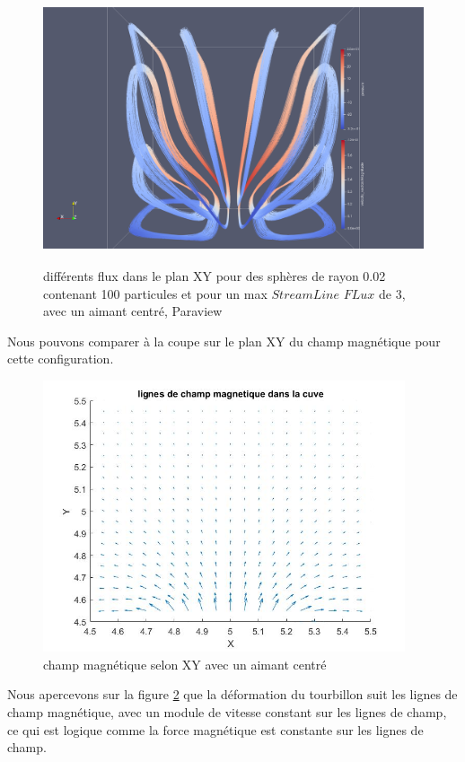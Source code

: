 \documentclass[a4paper,12pt,titlepage]{report}
\begin{document}
\begin{onehalfspace}
\begin{figure}[!h]
\begin{center}
\includegraphics[height = 8cm, keepaspectratio]{graphes/Paraview/differents_flux_centre_100pt_lenght4_rad05.png} 
\caption{\label{figure 33}différents flux dans le plan XY pour des sphères de rayon 0.02 contenant 100 particules et pour un max $StreamLine$ $FLux$ de 3, avec un aimant centré, Paraview}
\end{center}
\end{figure}

Nous pouvons comparer à la coupe sur le plan XY du champ magnétique pour cette configuration.

\begin{figure}[!h]
\begin{center} 
\includegraphics[height = 8cm, keepaspectratio]{graphes/coupe_2D_champ_centre.jpg} 
\caption{\label{figure 34} champ magnétique selon XY avec un aimant centré}
\end{center}
\end{figure}
Nous apercevons sur la figure \ref{figure 34} que la déformation du tourbillon suit les lignes de champ magnétique, avec un module de vitesse constant sur les lignes de champ, ce qui est logique comme la force magnétique est constante sur les lignes de champ.\\


\end{onehalfspace}
\end{document}
